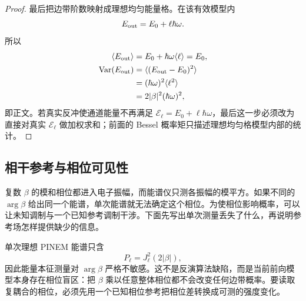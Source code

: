 \begin{proof}
最后把边带阶数映射成理想均匀能量格。在该有效模型内
\begin{equation*}
 E_{\rm out}=E_0+\ell\hbar\omega.
\end{equation*}
所以
\begin{align*}
 \langle E_{\rm out}\rangle
 &=E_0+\hbar\omega\langle\ell\rangle
 =E_0,\\
 \operatorname{Var}(E_{\rm out})
 &=\langle(E_{\rm out}-E_0)^2\rangle\\
 &=(\hbar\omega)^2\langle\ell^2\rangle\\
 &=2|\beta|^2(\hbar\omega)^2,
\end{align*}
即正文。若真实反冲使通道能量不再满足 $\mathcal E_\ell=E_0+\ell\hbar\omega$，最后这一步必须改为直接对真实 $\mathcal E_\ell$ 做加权求和；前面的 Bessel 概率矩只描述理想均匀格模型内部的统计。
\end{proof}




\subsection{相干参考与相位可见性}\label{subsec:pinem-coherent-reference-dp31}

复数 $\beta$ 的模和相位都进入电子振幅，而能谱仪只测各振幅的模平方。如果不同的 $\arg\beta$ 给出同一个能谱，单次能谱就无法确定这个相位。为使相位影响概率，可以让未知调制与一个已知参考调制干涉。下面先写出单次测量丢失了什么，再说明参考场怎样提供缺少的信息。

单次理想 PINEM 能谱只含
\begin{equation*}
 P_\ell=J_\ell^2(2|\beta|),
\end{equation*}
因此能量本征测量对 $\arg\beta$ 严格不敏感。这不是反演算法缺陷，而是当前前向模型本身存在相位盲区：把 $\beta$ 乘以任意整体相位都不会改变任何边带概率。要读取复耦合的相位，必须先用一个已知相位参考把相位差转换成可测的强度变化。

